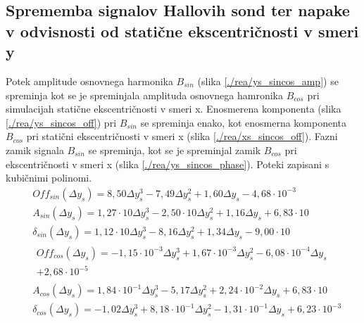 \subsection{Sprememba signalov Hallovih sond ter napake v odvisnosti od statične ekscentričnosti v smeri y}
Potek amplitude osnovnega harmonika $B_{sin}$ (slika \ref{./rea/ys_sincos_amp}) se spreminja kot se je spreminjala amplituda osnovnega hamronika $B_{cos}$ pri simulacijah statične ekscentričnosti v smeri x.  Enosmerena komponenta (slika \ref{./rea/ys_sincos_off}) pri $B_{sin}$ se spreminja enako, kot enosmerna komponenta $B_{cos}$ pri statični ekscentričnosti v smeri x (slika \ref{./rea/xs_sincos_off}).  Fazni zamik signala $B_{sin}$ se spreminja, kot se je spreminjal zamik  $B_{cos}$ pri ekscentričnosti v smeri x (slika \ref{./rea/ys_sincos_phase}). Poteki zapisani s kubičnimi polinomi.
\begin{eqnarray}
&Off_{sin}(\Delta y_s) =8,50\Delta y_s^{3}-7,49\Delta y_s^{2}+1,60\Delta y_s-4,68\cdot 10^{-3} \\                                        
&A_{sin}(\Delta y_s) =1,27\cdot 10\Delta y_s^{3}-2,50\cdot 10\Delta y_s^{2}+1,16\Delta y_s+6,83\cdot 10 \\                               
&\delta_{sin}(\Delta y_s) =1,12\cdot 10\Delta y_s^{3}-8,16\Delta y_s^{2}+1,34\Delta y_s-9,00\cdot 10 \\                                  
&\begin{split}Off_{cos}(\Delta y_s) =-1,15\cdot 10^{-3}\Delta y_s^{3}+1,67\cdot 10^{-3}\Delta y_s^{2}-6,08\cdot 10^{-4}\Delta y_s\\+2,68\cdot 10^{-5}\end{split} \\
&A_{cos}(\Delta y_s) =1,84\cdot 10^{-1}\Delta y_s^{3}-5,17\Delta y_s^{2}+2,24\cdot 10^{-2}\Delta y_s+6,83\cdot 10 \\                     
&\delta_{cos}(\Delta y_s) =-1,02\Delta y_s^{3}+8,18\cdot 10^{-1}\Delta y_s^{2}-1,31\cdot 10^{-1}\Delta y_s+6,23\cdot 10^{-3} 
\end{eqnarray}

